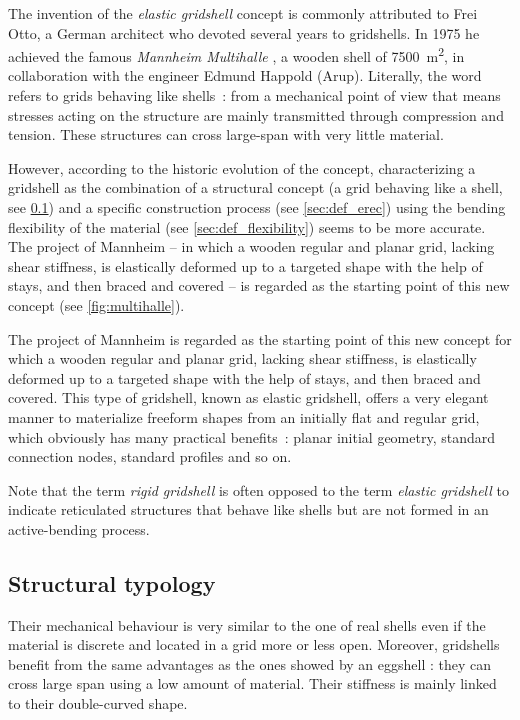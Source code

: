 The invention of the \emph{elastic gridshell} concept is commonly attributed to Frei Otto, a German architect who devoted several years to gridshells. In 1975 he achieved the famous \emph{Mannheim Multihalle} \cite{Happold1975}, a wooden shell of 7500~m\textsuperscript{2}, in collaboration with the engineer Edmund Happold (Arup).
Literally, the word  refers to grids behaving like shells~: from a mechanical point of view that means stresses acting on the structure are mainly transmitted through compression and tension. These structures can cross large-span with very little material.

However, according to the historic evolution of the concept, characterizing a gridshell as the combination of a structural concept (a grid behaving like a shell, see \cref{sec:def_topo}) and a specific construction process (see \cref{sec:def_erec}) using the bending flexibility of the material (see \cref{sec:def_flexibility}) seems to be more accurate. The project of Mannheim -- in which a wooden regular and planar grid, lacking shear stiffness, is elastically deformed up to a targeted shape with the help of stays, and then braced and covered -- is regarded as the starting point of this new concept (see \cref{fig:multihalle}).

The project of Mannheim is regarded as the starting point of this new concept for which a wooden regular and planar grid, lacking shear stiffness, is elastically deformed up to a targeted shape with the help of stays, and then braced and covered. This type of gridshell, known as elastic gridshell, offers a very elegant manner to materialize freeform shapes from an initially flat and regular grid, which obviously has many practical benefits~: planar initial geometry, standard connection nodes, standard profiles and so on.

Note that the term \emph{rigid gridshell} is often opposed to the term \emph{elastic gridshell} to indicate reticulated structures that behave like shells but are not formed in an active-bending process.

\subsection{Structural typology}\label{sec:def_topo}
Their mechanical behaviour is very similar to the one of real shells even if the material is discrete and located in a grid more or less open. Moreover, gridshells benefit from the same advantages as the ones showed by an eggshell : they can cross large span using a low amount of material. Their stiffness is mainly linked to their double-curved shape.


